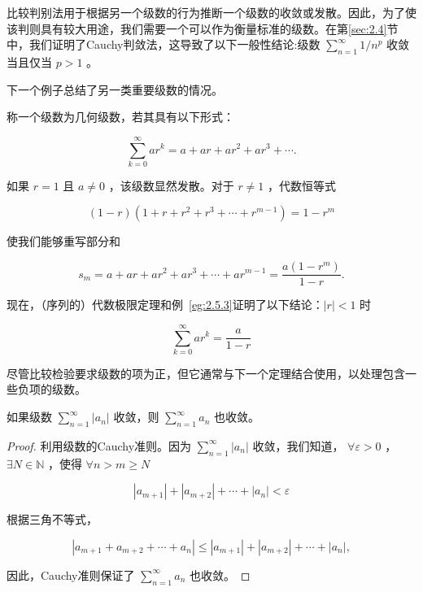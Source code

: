 比较判别法用于根据另一个级数的行为推断一个级数的收敛或发散。因此，为了使该判则具有较大用途，我们需要一个可以作为衡量标准的级数。在第\ref{sec:2.4}节中，我们证明了Cauchy判敛法，这导致了以下一般性结论:级数 \(\mathop{\sum }\limits_{{n = 1}}^{\infty }1/{n}^{p}\) 收敛当且仅当 \(p > 1\) 。

下一个例子总结了另一类重要级数的情况。

\begin{Eg}[几何级数]
  \label{eg:2.7.5}
称一个级数为几何级数，若其具有以下形式：

\[
\mathop{\sum }\limits_{{k = 0}}^{\infty }a{r}^{k} = a + {ar} + a{r}^{2} + a{r}^{3} + \cdots .
\]

如果 \(r = 1\) 且 \(a \neq  0\) ，该级数显然发散。对于 \(r \neq  1\) ，代数恒等式

\[
\left( {1 - r}\right) \left( {1 + r + {r}^{2} + {r}^{3} + \cdots  + {r}^{m - 1}}\right)  = 1 - {r}^{m}
\]

使我们能够重写部分和

\[
{s}_{m} = a + {ar} + a{r}^{2} + a{r}^{3} + \cdots  + a{r}^{m - 1} = \frac{a\left( {1 - {r}^{m}}\right) }{1 - r}.
\]

现在，（序列的）代数极限定理和例~\ref{eg:2.5.3}证明了以下结论：$\left| r \right|< 1$ 时

\[
\mathop{\sum }\limits_{{k = 0}}^{\infty }a{r}^{k} = \frac{a}{1 - r}
\]

\end{Eg}

尽管比较检验要求级数的项为正，但它通常与下一个定理结合使用，以处理包含一些负项的级数。

\begin{Thm}[绝对收敛检验]
  \label{thm:2.7.6}
  如果级数 \(\mathop{\sum }\limits_{{n = 1}}^{\infty }\left| {a}_{n}\right|\) 收敛，则 \(\mathop{\sum }\limits_{{n = 1}}^{\infty }{a}_{n}\) 也收敛。
\end{Thm}

\begin{proof}
利用级数的Cauchy准则。因为 \(\mathop{\sum }\limits_{{n = 1}}^{\infty }\left| {a}_{n}\right|\) 收敛，我们知道， \(\forall \varepsilon  > 0\) ， \(\exists N \in  \mathbb{N}\) ，使得 $\forall n> m \ge N$

\[
\left| {a}_{m + 1}\right|  + \left| {a}_{m + 2}\right|  + \cdots  + \left| {a}_{n}\right|  < \varepsilon
\]

根据三角不等式，

\[
\left| {{a}_{m + 1} + {a}_{m + 2} + \cdots  + {a}_{n}}\right|  \leq  \left| {a}_{m + 1}\right|  + \left| {a}_{m + 2}\right|  + \cdots  + \left| {a}_{n}\right| ,
\]

因此，Cauchy准则保证了 \(\mathop{\sum }\limits_{{n = 1}}^{\infty }{a}_{n}\) 也收敛。  
\end{proof}

